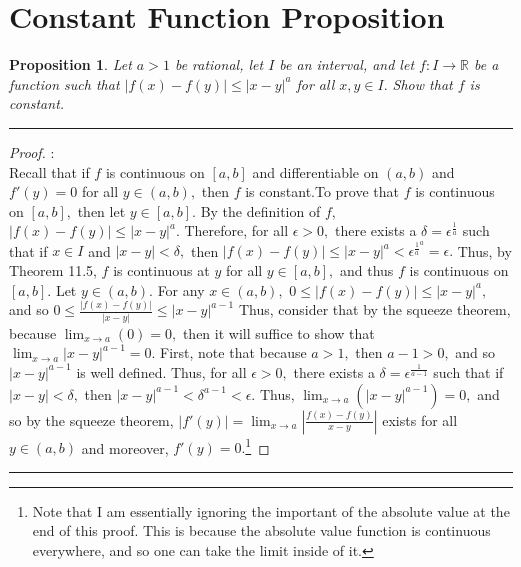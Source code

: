 \documentclass[openany, amssymb, psamsfonts]{amsart}
\newcommand{\bbR}{\mathbb{R}}
\newtheorem{prop}{Proposition}[section]
\theoremstyle{definition}
\numberwithin{equation}{section}
\begin{document}
\section*{Constant Function Proposition}
\begin{prop}
Let $a > 1$ be rational, let $I$ be an interval, and let
$f : I \to \bbR$ be a function such that $|f (x) - f (y)| \leq |x - y|^a$ for all $x, y \in I.$ Show
that $f$ is constant.
\end{prop}
\vspace{4pt}     \hrule   \vspace{4pt}\begin{proof}:\\
Recall that if $f$ is continuous on $[a,b]$ and differentiable on $(a,b)$ and $f'(y) = 0$ for all $y\in (a,b),$ then $f$ is constant.\newline\newline To prove that $f$ is continuous on $[a,b],$ then let $y \in [a,b].$ By the definition of $f,$ $|f(x) - f(y)|\leq |x-y|^a.$ Therefore, for all $\epsilon>0,$ there exists a $\delta = \epsilon^\frac{1}{a}$ such that if $x \in I$ and $|x-y|< \delta,$ then $|f(x) - f(y)|\leq |x-y|^a<\epsilon^{\frac{1}{a}^a} = \epsilon.$ Thus, by Theorem 11.5, $f$ is continuous at $y$ for all $y \in [a,b],$ and thus $f$ is continuous on $[a,b].$\newline\newline
Let $y\in (a,b).$ For any $x\in (a,b),$ $0\leq |f(x) - f(y)|\leq|x-y|^{a},$ and so $0\leq \frac{|f(x) - f(y)|}{|x-y|} \leq |x-y|^{a-1}$ Thus, consider that by the squeeze theorem, because $\displaystyle\lim_{x\to a}(0) =0,$ then it will suffice to show that $\displaystyle\lim_{x\to a}|x-y|^{a-1} = 0.$ First, note that because $a>1,$ then $a-1>0,$ and so $|x-y|^{a-1}$ is well defined. Thus, for all $\epsilon>0,$ there exists a $\delta = \epsilon^{\frac{1}{a-1}}$ such that if $|x-y|<\delta,$ then $|x-y|^{a-1}< \delta^{a-1}<\epsilon.$ Thus, $\displaystyle\lim_{x\to a}(|x-y|^{a-1}) = 0,$ and so by the squeeze theorem, $|f'(y)| = \displaystyle\lim_{x\to a}\left|\frac{f(x) - f(y)}{x-y}\right|$ exists for all $y\in (a,b)$ and moreover, $f'(y) = 0.$\footnote{Note that I am essentially ignoring the important of the absolute value at the end of this proof. This is because the absolute value function is continuous everywhere, and so one can take the limit inside of it.} 
\end{proof}\vspace{4pt}     \hrule   \vspace{4pt}
\newpage
\end{document}
